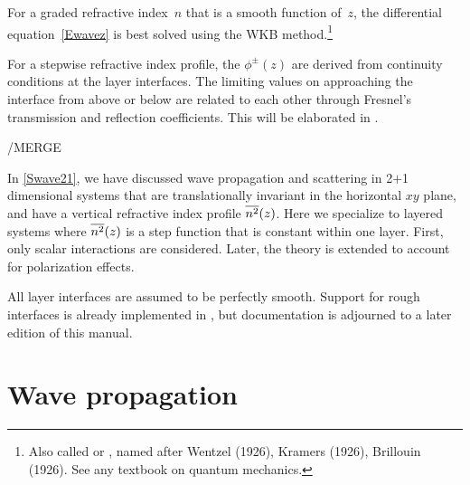
For a graded refractive index~$n$
 that is a smooth function of~$z$,
the differential equation~\cref{Ewavez} is best solved
using the WKB method.\footnote
{Also called  or
,
named after Wentzel (1926), Kramers (1926), Brillouin (1926).
See any textbook on quantum mechanics.}
%
%
%

For a stepwise refractive index profile,
the $\phi^\pm(z)$ are derived from continuity conditions at the layer interfaces.
The limiting values on approaching the interface from above or below
are related to each other through Fresnel's
transmission and reflection coefficients.
%
This will be elaborated in .

/MERGE

In \cref{Swave21},
we have discussed wave propagation and scattering in 2$+$1 dimensional systems
that are translationally invariant in the horizontal $xy$ plane,
and have a vertical refractive index profile $\overline{n^2}(z)$.
Here we specialize to layered systems
where $\overline{n^2}(z)$ is a step function that is constant within one layer.
First, only scalar interactions are considered.
Later, the theory is extended to account for polarization effects.


All layer interfaces are assumed to be perfectly smooth.
Support for rough interfaces is already implemented in \BornAgain,
but documentation is adjourned to a later edition of this manual.

\section{Wave propagation}\label{Slayerprop}

